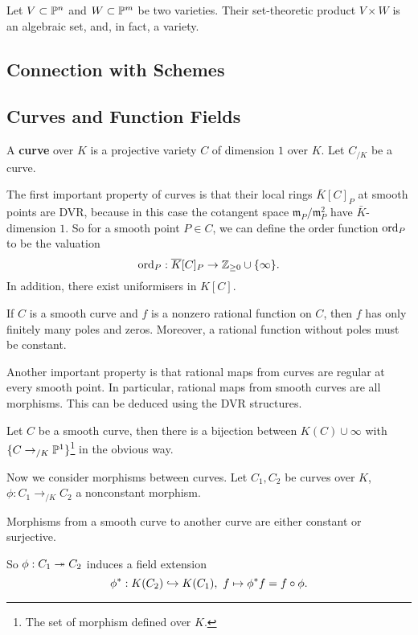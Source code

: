 Let $V\subset \P^n$ and $W\subset \P^m$ be two varieties.
Their set-theoretic product $V\times W$ is an algebraic set, and, in fact, a variety.

\subsection{Connection with Schemes}

\subsection{Curves and Function Fields}
A \textbf{curve} over $K$ is a projective variety $C$ of dimension $1$ over $K$. Let $C_{/K}$ be a curve.

The first important property of curves is that their local rings $\bar{K}[C]_P$ at smooth points are DVR, because in this case the cotangent space $\mathfrak{m}_P/\mathfrak{m}_P^2$ have $\bar{K}$-dimension $1$.
So for a smooth point $P\in C$, we can define the order function $\ord_P$ to be the valuation \[\ord_P : \bar{K}[C]_P \to\Z_{\ge 0}\cup\{\infty\}.\]
In addition, there exist uniformisers in $K[C]$.

\begin{proposition}
    If $C$ is a smooth curve and $f$ is a nonzero rational function on $C$, then $f$ has only finitely many poles and zeros.
    Moreover, a rational function without poles must be constant.
\end{proposition}

Another important property is that rational maps from curves are regular at every smooth point. In particular, rational maps from smooth curves are all morphisms. This can be deduced using the DVR structures.
\begin{example}
    Let $C$ be a smooth curve, then there is a bijection between $K(C)\cup{\infty}$ with $\{C\to_{/K}\P^1\}$\footnote{The set of morphism defined over $K$.} in the obvious way.
\end{example}

Now we consider morphisms between curves. Let $C_1, C_2$ be curves over $K$, $\phi : C_1\to_{/K}C_2$ a nonconstant morphism.
\begin{theorem}
    Morphisms from a smooth curve to another curve are either constant or surjective.
\end{theorem}
So $\phi : C_1\surject C_2$ induces a field extension \[\phi^* : K(C_2)\inject K(C_1),\ f \mapsto \phi^*f = f\circ \phi.\]

